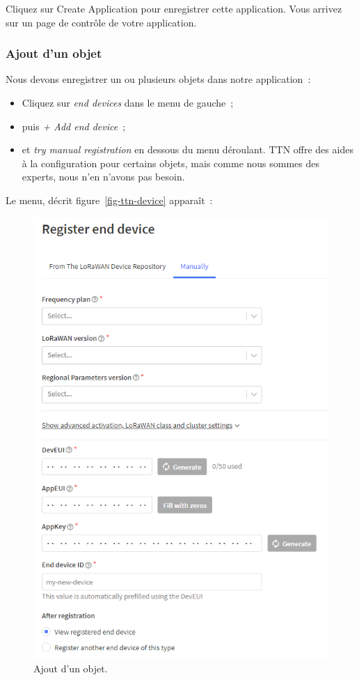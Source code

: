      \vspace{1em}

Cliquez sur Create Application pour enregistrer cette application. Vous arrivez sur un page de contrôle de votre application.

\subsubsection*{Ajout d'un objet}

Nous devons enregistrer un ou plusieurs objets dans notre application~:

\begin{itemize}
    \item Cliquez sur \textit{end devices} dans le menu de gauche~;
    \item puis \textit{+ Add end device}~;
    \item et \textit{try manual registration} en dessous du menu déroulant. TTN offre des aides à la configuration pour certains objets, mais comme nous sommes des experts, nous n'en n'avons pas besoin.
\end{itemize}

     \vspace{1em}


Le menu, décrit figure~\vref{fig-ttn-device} apparaît~:

\begin{figure}[tbp]
\centerline{\includegraphics[width=.7\columnwidth]{Pictures/ttn-device.png} }
\caption{Ajout d'un objet.}
\label{fig-ttn-device}
\end{figure}

